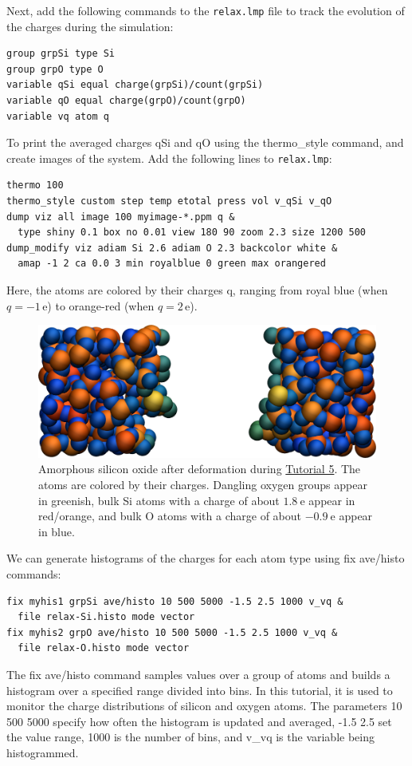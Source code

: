 \documentclass[9pt,tutorial]{livecoms}
\newcommand{\lmpcmd}[1]{\hspace{0pt}\colorbox{listing}{\textcolor{command}{\small{#1}}}\hspace{0pt}} %
\newcommand{\flecmd}[1]{\textcolor{command}{\texttt{#1}}} %
\begin{document}
Next, add the following commands to the \flecmd{relax.lmp} file to track the
evolution of the charges during the simulation:
\begin{lstlisting}
group grpSi type Si
group grpO type O
variable qSi equal charge(grpSi)/count(grpSi)
variable qO equal charge(grpO)/count(grpO)
variable vq atom q
\end{lstlisting}
To print the averaged charges \lmpcmd{qSi} and \lmpcmd{qO} using the
\lmpcmd{thermo\_style} command, and create images of the system.  Add the
following lines to \flecmd{relax.lmp}:
\begin{lstlisting}
thermo 100
thermo_style custom step temp etotal press vol v_qSi v_qO
dump viz all image 100 myimage-*.ppm q &
  type shiny 0.1 box no 0.01 view 180 90 zoom 2.3 size 1200 500
dump_modify viz adiam Si 2.6 adiam O 2.3 backcolor white &
  amap -1 2 ca 0.0 3 min royalblue 0 green max orangered
\end{lstlisting}
Here, the atoms are colored by their charges \lmpcmd{q}, ranging from royal blue
(when $q=-1\,\text{e}$) to orange-red (when $q=2\,\text{e}$).

\begin{figure}
\includegraphics[width=\linewidth]{SIO-deformed}
\caption{Amorphous silicon oxide after deformation during
\hyperref[reactive-silicon-dioxide-label]{Tutorial 5}.  The atoms are colored by their
charges.  Dangling oxygen groups appear in greenish, bulk Si atoms with a charge of
about $1.8~\text{e}$  appear in red/orange, and bulk O atoms with a charge of
about $-0.9 ~ \text{e}$ appear in blue.}
\label{fig:SIO-deformed}
\end{figure}

We can generate histograms of the charges for each atom type using
\lmpcmd{fix ave/histo} commands:
\begin{lstlisting}
fix myhis1 grpSi ave/histo 10 500 5000 -1.5 2.5 1000 v_vq &
  file relax-Si.histo mode vector
fix myhis2 grpO ave/histo 10 500 5000 -1.5 2.5 1000 v_vq &
  file relax-O.histo mode vector
\end{lstlisting}
{\color{blue}The \lmpcmd{fix ave/histo} command samples values
over a group of atoms and builds a histogram over a specified range divided into
bins.  In this tutorial, it is used to monitor the charge distributions
of silicon and oxygen atoms.  The parameters \lmpcmd{10 500 5000} specify how often
the histogram is updated and averaged, \lmpcmd{-1.5 2.5} set the value range, 
\lmpcmd{1000} is the number of bins, and \lmpcmd{v\_vq} is the variable being histogrammed.}
\end{document}
